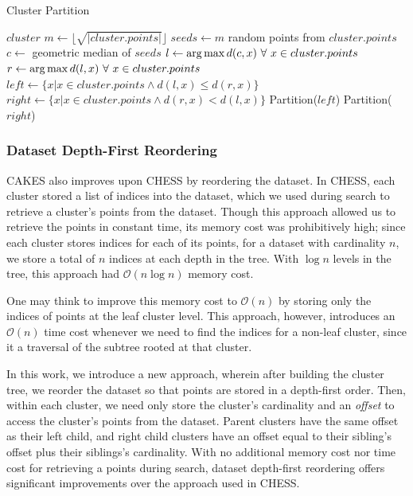 \begin{algorithm} %
\caption{Cluster Partition} %
\label{alg:partition} %
\begin{algorithmic}[1] %
    \REQUIRE $cluster$
    \STATE $m \leftarrow \lfloor \sqrt{|cluster.points|} \rfloor$
    \STATE $seeds \leftarrow m$ random points from $cluster.points$
    \STATE $c \leftarrow$ geometric median of $seeds$
    \STATE $l \leftarrow \operatorname*{arg\,max} d(c,x) \ \forall \ x \in cluster.points$
    \STATE $r \leftarrow \operatorname*{arg\,max} d(l,x) \ \forall \ x \in cluster.points$
    \STATE $left \leftarrow \{x | x \in cluster.points \land d(l,x) \le d(r,x)\}$
    \STATE $right \leftarrow \{x | x \in cluster.points \land d(r,x) < d(l,x)\}$
        \STATE Partition($left$)
    \ENDIF
        \STATE Partition($right$)
    \ENDIF
\end{algorithmic}
\end{algorithm}

\subsubsection {Dataset Depth-First Reordering}
\label{subsubsec:methods:dataset-depth-first-reordering}

CAKES also improves upon CHESS by reordering the dataset. In CHESS, each cluster stored a list of indices into the dataset, 
which we used during search to retrieve a cluster's points from the dataset. 
Though this approach allowed us to retrieve the points in constant 
time, its memory cost was prohibitively high; since each cluster stores indices for each of its
points, for a dataset with cardinality $n$, we store a total of $n$ indices at each depth in the tree.
With $\log{}n$ levels in the tree, this approach had $\mathcal{O}(n\log{}n)$ memory cost. 


One may think to improve this memory cost to $\mathcal{O}(n)$ by storing only the indices of points at 
the leaf cluster level.
This approach, however, introduces an $\mathcal{O}(n)$ time cost whenever we need to find the indices for 
a non-leaf cluster, since it a traversal of the subtree rooted at that cluster.


In this work, we introduce a new approach, wherein after building the cluster tree, we reorder the dataset 
so that points are stored in a depth-first order. Then, within each cluster, we need only 
store the cluster's cardinality and an \emph{offset} to access the cluster's points from the dataset. Parent clusters 
have the same offset as their left child, and right child clusters have an offset equal to their sibling's offset
plus their siblings's cardinality. With no additional memory cost nor time cost for retrieving a points during search, 
dataset depth-first reordering offers significant improvements over the approach used in CHESS.


